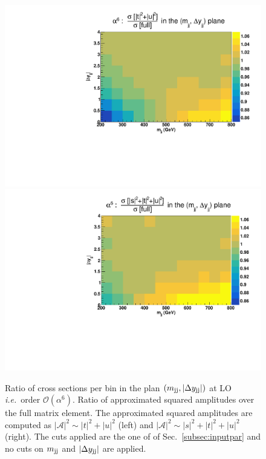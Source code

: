 \begin{figure}[hbt]
\centering
\includegraphics[scale=0.395]{figures/scanfigures/ratio_tu.pdf}
\includegraphics[scale=0.395]{figures/scanfigures/ratio_stu.pdf}
\caption{Ratio of cross sections per bin in the plan $\left(m_{\text{j}\text{j}}, |\Delta y_{\text{j}\text{j}}| \right)$ at LO \emph{i.e.}\ order $\mathcal{O}(\alpha^6)$.
Ratio of approximated squared amplitudes over the full matrix element.
The approximated squared amplitudes are computed as $|\mathcal{A}|^2 \sim |t|^2 + |u|^2$ (left) and $|\mathcal{A}|^2 \sim |s|^2 + |t|^2 + |u|^2$ (right).
The cuts applied are the one of of Sec.~\ref{subsec:inputpar} and no cuts on $m_{\text{j}\text{j}}$ and $|\Delta y_{\text{j}\text{j}}|$ are applied.} 
\label{fig:ratio2d_LO}
\end{figure}

